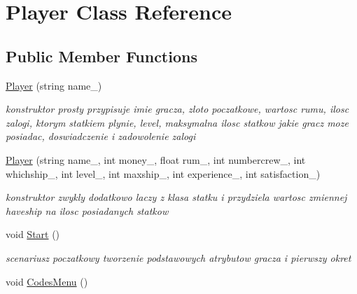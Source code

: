 \hypertarget{class_player}{}\section{Player Class Reference}
\label{class_player}
\subsection*{Public Member Functions}
\begin{DoxyCompactItemize}
\item 
\mbox{\label{class_player_a3c3ccb417f0a1afa1efdc882a8097718}} 
\hyperlink{class_player_a3c3ccb417f0a1afa1efdc882a8097718}{Player} (string name\+\_\+)
\begin{DoxyCompactList}\small\item\em konstruktor prosty przypisuje imie gracza, zloto poczatkowe, wartosc rumu, ilosc zalogi, ktorym statkiem plynie, level, maksymalna ilosc statkow jakie gracz moze posiadac, doswiadczenie i zadowolenie zalogi \end{DoxyCompactList}\item 
\mbox{\label{class_player_a32efbe7a5af55d105409031f5706cd0f}} 
\hyperlink{class_player_a32efbe7a5af55d105409031f5706cd0f}{Player} (string name\+\_\+, int money\+\_\+, float rum\+\_\+, int numbercrew\+\_\+, int whichship\+\_\+, int level\+\_\+, int maxship\+\_\+, int experience\+\_\+, int satisfaction\+\_\+)
\begin{DoxyCompactList}\small\item\em konstruktor zwykly dodatkowo laczy z klasa statku i przydziela wartosc zmiennej haveship na ilosc posiadanych statkow \end{DoxyCompactList}\item 
\mbox{\label{class_player_a54de25087f17985430c4316bf5a7f368}} 
void \hyperlink{class_player_a54de25087f17985430c4316bf5a7f368}{Start} ()
\begin{DoxyCompactList}\small\item\em scenariusz poczatkowy tworzenie podstawowych atrybutow gracza i pierwszy okret \end{DoxyCompactList}\item 
\mbox{\label{class_player_a28e5f8eafd2b969be00a75d9acde3693}} 
void \hyperlink{class_player_a28e5f8eafd2b969be00a75d9acde3693}{Codes\+Menu} ()

\end{DoxyCompactItemize}
